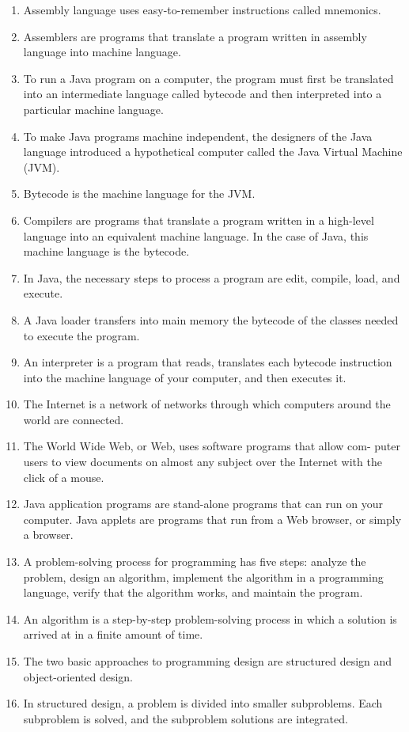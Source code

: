 \documentclass[12pt,a4paper,final,twoside,onecolumn,titlepage]{book}
\begin{document}
\begin{enumerate}
\item Assembly language uses easy-to-remember instructions called mnemonics.
\item Assemblers are programs that translate a program written in assembly
language into machine language.
\item To run a Java program on a computer, the program must first be translated into an intermediate language called bytecode and then interpreted into a particular machine language.
\item To make Java programs machine independent, the designers of the Java language introduced a hypothetical computer called the Java Virtual Machine (JVM).
\item Bytecode is the machine language for the JVM.
\item Compilers are programs that translate a program written in a high-level language into an equivalent machine language. In the case of Java, this machine language is the bytecode.
\item In Java, the necessary steps to process a program are edit, compile, load, and execute.
\item A Java loader transfers into main memory the bytecode of the classes needed to execute the program.
\item An interpreter is a program that reads, translates each bytecode instruction into the machine language of your computer, and then executes it.
\item The Internet is a network of networks through which computers around the world are connected.
\item The World Wide Web, or Web, uses software programs that allow com- puter users to view documents on almost any subject over the Internet with the click of a mouse.
\item Java application programs are stand-alone programs that can run on your computer. Java applets are programs that run from a Web browser, or simply a browser.
\item A problem-solving process for programming has five steps: analyze the problem, design an algorithm, implement the algorithm in a programming language, verify that the algorithm works, and maintain the program.
\item An algorithm is a step-by-step problem-solving process in which a solution is arrived at in a finite amount of time.
\item The two basic approaches to programming design are structured design and object-oriented design.
\item In structured design, a problem is divided into smaller subproblems. Each subproblem is solved, and the subproblem solutions are integrated.

\end{enumerate}
\end{document}
